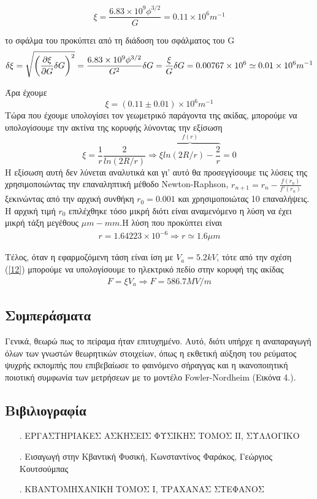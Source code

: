 \documentclass[a4paper]{article}
\begin{document}
 \begin{equation}
 \xi = \frac{6.83\times 10^9 \phi^{3/2}}{G} = 0.11\times10^6 m^{-1}
 \end{equation}
 
 
 το σφάλμα του προκύπτει από τη διάδοση του σφάλματος του G
 \begin{equation}
 \delta\xi = \sqrt{\left( \pdv{\xi}{G}\delta G \right)^2} = \frac{6.83\times10^9\phi^{3/2}}{G^2} \delta G = \frac{\xi}{G}\delta G=            0.00767\times10^6\simeq0.01\times10^6 m^{-1}
 \end{equation}

 Άρα έχουμε 
 \begin{equation} 
 \xi = (0.11\pm0.01 )\times10^6 m^{-1}
 \end{equation}
 Τώρα που έχουμε υπολογίσει τον γεωμετρικό παράγοντα της ακίδας, μπορούμε να υπολογίσουμε την ακτίνα της κορυφής λύνοντας την εξίσωση
 \begin{equation}
 \xi=\frac{1}{r}\frac{2}{ln(2R/r)} \Rightarrow \overbrace{\xi ln(2R/r) - \frac{2}{r}}^{f(r)} = 0 
 \end{equation}
 Η εξίσωση αυτή δεν λύνεται αναλυτικά και γι' αυτό θα προσεγγίσουμε τις λύσεις της χρησιμοποιώντας την επαναληπτική μέθοδο Newton-Raphson, $r_{n+1} = r_n-\frac{f(r_n)}{f'(r_n)}$ ξεκινώντας από την αρχική συνθήκη $r_0=0.001$ και χρησιμοποιώτας 10 επαναλήψεις. Η αρχική τιμή $r_0$ επιλέχθηκε τόσο μικρή διότι είναι αναμενόμενο η λύση να έχει μικρή τάξη μεγέθους $\mu m - mm$.Η λύση που προκύπτει είναι 
 \begin{align*}
 r = 1.64223\times10^{-6}  \Rightarrow \boxed{r \simeq 1.6\mu m}
 \end{align*}
 
 Τέλος, όταν η εφαρμοζόμενη τάση είναι ίση με $V_a = 5.2kV$, τότε από την σχέση (\ref{12}) μπορούμε να υπολογίσουμε το ηλεκτρικό πεδίο στην κορυφή της ακίδας 
 \begin{align*}
 F=\xi V_a\Rightarrow \boxed{F =586.7 MV/m}
 \end{align*}
\subsection*{Συμπεράσματα}
Γενικά, θεωρώ πως το πείραμα ήταν επιτυχημένο. Αυτό, διότι υπήρχε η αναπαραγωγή όλων των γνωστών θεωρητικών στοιχείων, όπως η εκθετική αύξηση του ρεύματος ψυχρής εκπομπής που επιβεβαίωσε το φαινόμενο σήραγγας και η ικανοποιητική ποιοτική συμφωνία των μετρήσεων με το μοντέλο Fowler-Nordheim (Εικόνα 4.).
\subsection*{Βιβιλιογραφία}
\begin{itemize}
\item[.] ΕΡΓΑΣΤΗΡΙΑΚΕΣ ΑΣΚΗΣΕΙΣ ΦΥΣΙΚΗΣ ΤΟΜΟΣ ΙΙ, ΣΥΛΛΟΓΙΚΟ
\item[.] Εισαγωγή στην Κβαντική Φυσική, Κωνσταντίνος Φαράκος, Γεώργιος Κουτσούμπας
\item[.] ΚΒΑΝΤΟΜΗΧΑΝΙΚΗ ΤΟΜΟΣ Ι, ΤΡΑΧΑΝΑΣ ΣΤΕΦΑΝΟΣ
\end{itemize}
\end{document}
